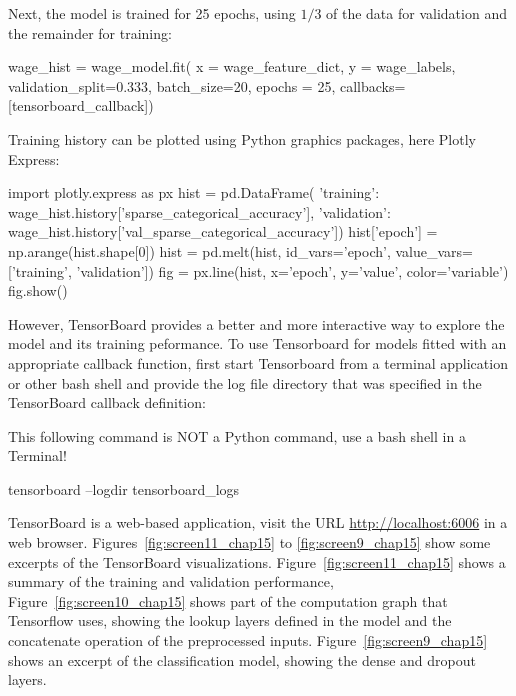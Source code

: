 Next, the model is trained for 25 epochs, using $1/3$ of the data for validation and the remainder for training:

\begin{samepage}
\begin{pythoncode}
wage_hist = wage_model.fit(
    x = wage_feature_dict,
    y = wage_labels,
    validation_split=0.333,
    batch_size=20,
    epochs = 25,
    callbacks=[tensorboard_callback])
\end{pythoncode}
\end{samepage}

Training history can be plotted using Python graphics packages, here Plotly Express:

\begin{samepage}
\begin{pythoncode}
import plotly.express as px
hist = pd.DataFrame({
    'training': 
        wage_hist.history['sparse_categorical_accuracy'],
    'validation': 
        wage_hist.history['val_sparse_categorical_accuracy']})
hist['epoch'] = np.arange(hist.shape[0])
hist = pd.melt(hist, id_vars='epoch', 
                     value_vars=['training', 'validation'])
fig = px.line(hist, x='epoch', y='value', color='variable')
fig.show()
\end{pythoncode}
\end{samepage}

However, TensorBoard provides a better and more interactive way to explore the model and its training peformance. To use Tensorboard for models fitted with an appropriate callback function, first start Tensorboard from a terminal application or other bash shell and provide the log file directory that was specified in the TensorBoard callback definition:

\begin{tcolorbox}[colback=alert]
\small
This following command is NOT a Python command, use a bash shell in a Terminal!
\normalsize
\end{tcolorbox}

\begin{bashcode}
tensorboard --logdir tensorboard_logs
\end{bashcode}

\noindent TensorBoard is a web-based application, visit the URL \url{http://localhost:6006} in a web browser. Figures~\ref{fig:screen11_chap15} to \ref{fig:screen9_chap15} show some excerpts of the TensorBoard visualizations. Figure~\ref{fig:screen11_chap15} shows a summary of the training and validation performance, Figure~\ref{fig:screen10_chap15} shows part of the computation graph that Tensorflow uses, showing the lookup layers defined in the model and the concatenate operation of the preprocessed inputs. Figure~\ref{fig:screen9_chap15} shows an excerpt of the classification model, showing the dense and dropout layers.

